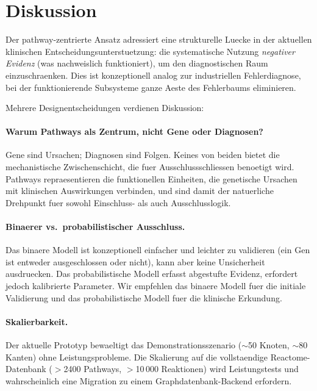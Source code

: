 \documentclass[12pt,a4paper]{article}
\begin{document}
\section{Diskussion}
\label{sec:discussion}

Der pathway-zentrierte Ansatz adressiert eine strukturelle Luecke in der aktuellen klinischen Entscheidungsunterstuetzung: die systematische Nutzung \emph{negativer Evidenz} (was nachweislich funktioniert), um den diagnostischen Raum einzuschraenken. Dies ist konzeptionell analog zur industriellen Fehlerdiagnose, bei der funktionierende Subsysteme ganze Aeste des Fehlerbaums eliminieren.

Mehrere Designentscheidungen verdienen Diskussion:

\paragraph{Warum Pathways als Zentrum, nicht Gene oder Diagnosen?} Gene sind Ursachen; Diagnosen sind Folgen. Keines von beiden bietet die mechanistische Zwischenschicht, die fuer Ausschlussschliessen benoetigt wird. Pathways repraesentieren die funktionellen Einheiten, die genetische Ursachen mit klinischen Auswirkungen verbinden, und sind damit der natuerliche Drehpunkt fuer sowohl Einschluss- als auch Ausschlusslogik.

\paragraph{Binaerer vs.\ probabilistischer Ausschluss.} Das binaere Modell ist konzeptionell einfacher und leichter zu validieren (ein Gen ist entweder ausgeschlossen oder nicht), kann aber keine Unsicherheit ausdruecken. Das probabilistische Modell erfasst abgestufte Evidenz, erfordert jedoch kalibrierte Parameter. Wir empfehlen das binaere Modell fuer die initiale Validierung und das probabilistische Modell fuer die klinische Erkundung.

\paragraph{Skalierbarkeit.} Der aktuelle Prototyp bewaeltigt das Demonstrationsszenario ($\sim$50 Knoten, $\sim$80 Kanten) ohne Leistungsprobleme. Die Skalierung auf die vollstaendige Reactome-Datenbank ($>$2400 Pathways, $>$10\,000 Reaktionen) wird Leistungstests und wahrscheinlich eine Migration zu einem Graphdatenbank-Backend erfordern.
\end{document}
